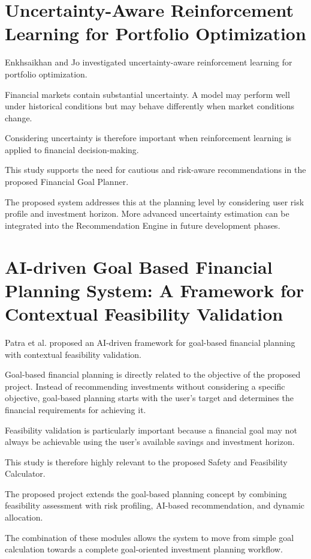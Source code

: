 \section{Uncertainty-Aware Reinforcement Learning for Portfolio Optimization}
Enkhsaikhan and Jo investigated uncertainty-aware reinforcement learning for portfolio optimization.

Financial markets contain substantial uncertainty. A model may perform well under historical conditions but may behave differently when market conditions change.

Considering uncertainty is therefore important when reinforcement learning is applied to financial decision-making.

This study supports the need for cautious and risk-aware recommendations in the proposed Financial Goal Planner.

The proposed system addresses this at the planning level by considering user risk profile and investment horizon. More advanced uncertainty estimation can be integrated into the Recommendation Engine in future development phases.

\section{AI-driven Goal Based Financial Planning System: A Framework for Contextual Feasibility Validation}
Patra et al. proposed an AI-driven framework for goal-based financial planning with contextual feasibility validation.

Goal-based financial planning is directly related to the objective of the proposed project. Instead of recommending investments without considering a specific objective, goal-based planning starts with the user's target and determines the financial requirements for achieving it.

Feasibility validation is particularly important because a financial goal may not always be achievable using the user's available savings and investment horizon.

This study is therefore highly relevant to the proposed Safety and Feasibility Calculator.

The proposed project extends the goal-based planning concept by combining feasibility assessment with risk profiling, AI-based recommendation, and dynamic allocation.

The combination of these modules allows the system to move from simple goal calculation towards a complete goal-oriented investment planning workflow.

